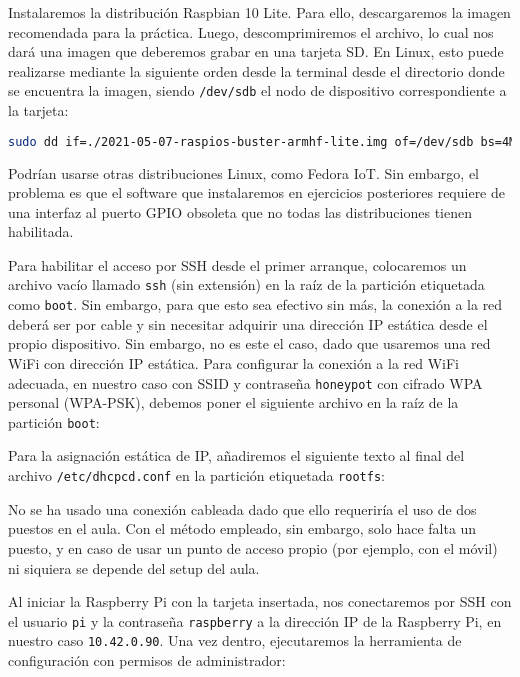 Instalaremos la distribución Raspbian 10 Lite. Para ello, descargaremos la
imagen recomendada para la práctica\footnotemark. Luego, descomprimiremos el
archivo, lo cual nos dará una imagen que deberemos grabar en una tarjeta SD. En
Linux, esto puede realizarse mediante la siguiente orden desde la terminal
desde el directorio donde se encuentra la imagen, siendo \verb|/dev/sdb| el
nodo de dispositivo correspondiente a la tarjeta:


\begin{lstlisting}[language=sh]
sudo dd if=./2021-05-07-raspios-buster-armhf-lite.img of=/dev/sdb bs=4M status=progress
\end{lstlisting}

Podrían usarse otras distribuciones Linux, como Fedora IoT. Sin embargo, el
problema es que el software que instalaremos en ejercicios posteriores
requiere de una interfaz al puerto GPIO obsoleta que no todas las
distribuciones tienen habilitada.

Para habilitar el acceso por SSH desde el primer arranque, colocaremos un
archivo vacío llamado \verb|ssh| (sin extensión) en la raíz de la partición
etiquetada como \verb|boot|. Sin embargo, para que esto sea efectivo sin más,
la conexión a la red deberá ser por cable y sin necesitar adquirir una
dirección IP estática desde el propio dispositivo. Sin embargo, no es este el
caso, dado que usaremos una red WiFi con dirección IP estática. Para configurar
la conexión a la red WiFi adecuada, en nuestro caso con SSID y contraseña
\verb|honeypot| con cifrado WPA personal (WPA-PSK), debemos poner el siguiente
archivo en la raíz de la partición \verb|boot|:



Para la asignación estática de IP, añadiremos el siguiente texto al final del
archivo \verb|/etc/dhcpcd.conf| en la partición etiquetada \verb|rootfs|:



No se ha usado una conexión cableada dado que ello requeriría el uso de dos
puestos en el aula. Con el método empleado, sin embargo, solo hace falta un
puesto, y en caso de usar un punto de acceso propio (por ejemplo, con el móvil)
ni siquiera se depende del setup del aula.

Al iniciar la Raspberry Pi con la tarjeta insertada, nos conectaremos por SSH
con el usuario \verb|pi| y la contraseña \verb|raspberry| a la dirección IP de
la Raspberry Pi, en nuestro caso \verb|10.42.0.90|. Una vez dentro,
ejecutaremos la herramienta de configuración con permisos de administrador:

